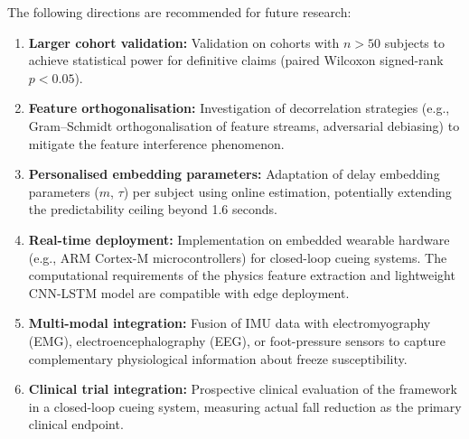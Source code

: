 \documentclass[12pt,a4paper,oneside]{report}
\numberwithin{equation}{chapter}
\numberwithin{figure}{chapter}
\numberwithin{table}{chapter}
\begin{document}
The following directions are recommended for future research:

\begin{enumerate}[leftmargin=*, itemsep=4pt]
  \item \textbf{Larger cohort validation:} Validation on cohorts with $n > 50$ subjects to achieve statistical power for definitive claims (paired Wilcoxon signed-rank $p < 0.05$).

  \item \textbf{Feature orthogonalisation:} Investigation of decorrelation strategies (e.g., Gram--Schmidt orthogonalisation of feature streams, adversarial debiasing) to mitigate the feature interference phenomenon.

  \item \textbf{Personalised embedding parameters:} Adaptation of delay embedding parameters ($m$, $\tau$) per subject using online estimation, potentially extending the predictability ceiling beyond 1.6 seconds.

  \item \textbf{Real-time deployment:} Implementation on embedded wearable hardware (e.g., ARM Cortex-M microcontrollers) for closed-loop cueing systems. The computational requirements of the physics feature extraction and lightweight CNN-LSTM model are compatible with edge deployment.

  \item \textbf{Multi-modal integration:} Fusion of IMU data with electromyography (EMG), electroencephalography (EEG), or foot-pressure sensors to capture complementary physiological information about freeze susceptibility.

  \item \textbf{Clinical trial integration:} Prospective clinical evaluation of the framework in a closed-loop cueing system, measuring actual fall reduction as the primary clinical endpoint.
\end{enumerate}



\end{document}
